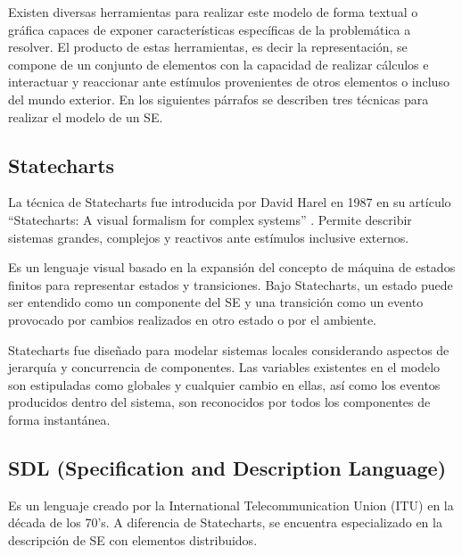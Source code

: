 \documentclass[journal]{IEEEtran}
\begin{document}
Existen diversas herramientas para realizar este modelo de forma textual o gráfica capaces de exponer características específicas de la problemática a resolver.
El producto de estas herramientas, es decir la representación, se compone de un conjunto de elementos con la capacidad de realizar cálculos e interactuar y reaccionar ante estímulos provenientes de otros elementos o incluso del mundo exterior.
En los siguientes párrafos se describen tres técnicas para realizar el modelo de un SE.

\subsection{Statecharts}
La técnica de Statecharts fue introducida por David Harel en 1987 en su artículo ``Statecharts: A visual formalism for complex systems'' \cite{Harel1987}.
Permite describir sistemas grandes, complejos y reactivos ante estímulos inclusive externos.

Es un lenguaje visual basado en la expansión del concepto de máquina de estados finitos para representar estados y transiciones.
Bajo Statecharts, un estado puede ser entendido como un componente del SE y una transición como un evento provocado por cambios realizados en otro estado o por el ambiente.

Statecharts fue diseñado para modelar sistemas locales considerando aspectos de jerarquía y concurrencia de componentes.
Las variables existentes en el modelo son estipuladas como globales y cualquier cambio en ellas, así como los eventos producidos dentro del sistema, son reconocidos por todos los componentes de forma instantánea.

\subsection{SDL (Specification and Description Language)}
Es un lenguaje creado por la International Telecommunication Union (ITU) en la década de los 70’s.
A diferencia de Statecharts, se encuentra especializado en la descripción de SE con elementos distribuidos.
\end{document}
